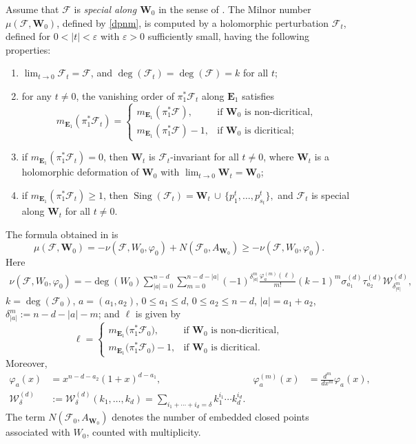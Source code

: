 \documentclass[10pt,twoside]{amsart}
\numberwithin{equation}{section}
\theoremstyle{definition}
\theoremstyle{remark}
\DeclareMathOperator{\sing}{Sing}
\newcommand{\dps}{\displaystyle}
\newcommand{\ep}{\varepsilon}
\newcommand{\fol}{\mathcal{F}}
\newcommand{\W}{\mathbf{W}}
\newcommand{\E}{\mathbf{E}}
\begin{document}
Assume that $\fol$ is \emph{special along $\W_0$} in the sense of \cite{GC1,AG}. The Milnor number $\mu(\fol,\W_0)$, defined by \eqref{dpnm}, is computed by a holomorphic perturbation $\fol_t$, defined for $0<|t|<\ep$ with $\ep>0$ sufficiently small, having the following properties:
\begin{enumerate}
\item[(i)] $\dps\lim_{t\to 0}\fol_t=\fol$, and $\deg(\fol_t)=\deg(\fol)=k$ for all $t$;
\item[(ii)] for any $t\neq 0$, the vanishing order of $\pi_1^{*}\fol_t$ along $\E_1$ satisfies
\[
m_{\E_1}(\pi_1^*\fol_t)=
\begin{cases}
m_{\E_1}(\pi_1^*\fol), & \text{if $\W_0$ is non-dicritical},\\[2pt]
m_{\E_1}(\pi_1^*\fol)-1, & \text{if $\W_0$ is dicritical};
\end{cases}
\]
\item[(iii)] if $m_{\E_1}(\pi_1^*\fol_t)=0$, then $\W_t$ is $\fol_t$-invariant for all $t\neq 0$,
where $\W_t$ is a holomorphic deformation of $\W_0$ with $\dps\lim_{t\to 0}\W_t=\W_0$;
\item[(iv)] if $m_{\E_1}(\pi_1^*\fol_t)\geq 1$, then
$
\sing(\fol_t)=\W_t \,\cup\, \{p_1^t,\ldots,p_{s_t}^t\},
$
and $\fol_t$ is special along $\W_t$ for all $t\neq 0$.
\end{enumerate}

The formula obtained in \cite{GC1,AG} is
\begin{equation}\label{nmiln}
\mu(\fol,\W_0)=-\nu(\fol,W_0,\varphi_0)+N(\fol_0,A_{\W_0})\geq-\nu(\fol,W_0,\varphi_0).
\end{equation}
Here
\begin{align}\label{nu_equ}
\nu(\fol,W_0,\varphi_0)=-\deg(W_0)\sum_{|a|=0}^{n-d}\sum_{m=0}^{n-d-|a|}(-1)^{\delta_{|a|}^{m}}\frac{\varphi_{a}^{(m)}(\ell)}{m!}(k-1)^{m}\sigma_{a_1}^{(d)}\tau_{a_2}^{(d)}\mathcal{W}_{\delta_{|a|}^{m}}^{(d)},
\end{align}
$k=\deg(\fol_0)$, $a=(a_1,a_2)$, $0\leq a_1 \leq d$, $0\leq a_2 \leq n-d$, $|a|=a_1+a_2$,
$\delta_{|a|}^{m}:=n-d-|a|-m$; and $\ell$ is given by
\[
\ell=
\begin{cases}
 m_{\E_1}\bigl(\pi_1^*\fol_0\bigr), & \text{if $\W_0$ is non-dicritical},\\
 m_{\E_1}\bigl(\pi_1^*\fol_0\bigr)-1, & \text{if $\W_0$ is dicritical}.
\end{cases}
\]
Moreover,
\begin{align*}
\varphi_a(x)&=x^{n-d-a_2}(1+x)^{d-a_1},
& \varphi_a^{(m)}(x)&=\frac{d^m}{dx^m}\varphi_a(x),\\
\mathcal W_\delta^{(d)}
&:=\mathcal W_\delta^{(d)}(k_1,\ldots,k_d)
=\sum_{i_1+\cdots+i_d=\delta}k_1^{i_1}\cdots k_d^{i_d}.
\end{align*}
The term $N(\fol_0,A_{\W_0})$ denotes the number of embedded closed points associated with $W_0$, counted with multiplicity.
\end{document}
